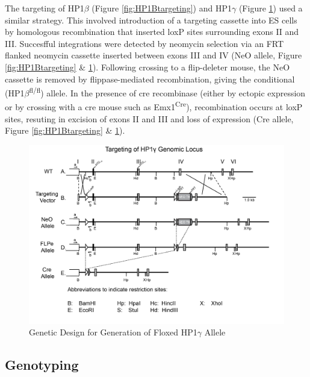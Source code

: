 \documentclass[onehalf,12pt]{beavtex}
\begin{document}
  The targeting of HP1\(\beta\) (Figure \ref{fig:HP1Btargeting}) and
  HP1\(\gamma\) (Figure \ref{fig:HP1gtargeting}) used a similar strategy.
  This involved introduction of a targeting cassette into ES cells by
  homologous recombination that inserted loxP sites surrounding exons II
  and III. Succesfful integrations were detected by neomycin selection via
  an FRT flanked neomycin cassette inserted between exons III and IV (NeO
  allele, Figure \ref{fig:HP1Btargeting} \& \ref{fig:HP1gtargeting}).
  Following crossing to a flip-deleter mouse, the NeO cassette is removed
  by flippase-mediated recombination, giving the conditional
  (HP1\(\beta\)\textsuperscript{fl/fl}) allele. In the presence of cre
  recombinase (either by ectopic expression or by crossing with a cre
  mouse such as Emx1\textsuperscript{Cre}), recombination occurs at loxP
  sites, resuting in excision of exons II and III and loss of expression
  (Cre allele, Figure \ref{fig:HP1Btargeting} \& \ref{fig:HP1gtargeting}).
  
  \begin{figure}
  
  {\centering \includegraphics[width=1\linewidth]{./data/methods/HP1gTargeting} 
  
  }
  
  \caption[Genetic Design for Generation of Floxed HP1$\gamma$ Allele]{Genetic Design for Generation of Floxed HP1$\gamma$ Allele}\label{fig:HP1gtargeting}
  \end{figure}
  
  \subsection{Genotyping}\label{genotyping}
  
\end{document}
